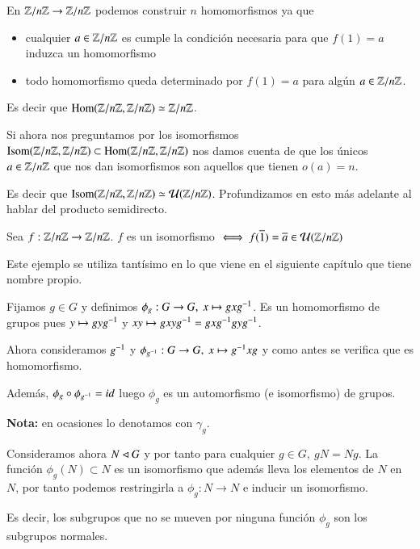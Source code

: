 \begin{ej}
	En $\mathbb{Z}/n\mathbb{Z} \to \mathbb{Z}/n\mathbb{Z}$ podemos construir $n$ homomorfismos ya que
	\begin{itemize}
		\item cualquier $a \in \mathbb{Z}/n\mathbb{Z}$ es cumple la condición necesaria para que $f(1) = a$ induzca un homomorfismo
		\item todo homomorfismo queda determinado por $f(1) = a$ para algún $a \in \mathbb{Z}/n\mathbb{Z}$.
	\end{itemize}
	
	Es decir que $\text{Hom}(\mathbb{Z}/n\mathbb{Z}, \mathbb{Z}/n\mathbb{Z}) \simeq \mathbb{Z}/n\mathbb{Z}$.
\end{ej}

\begin{ej}
	Si ahora nos preguntamos por los isomorfismos $\text{Isom}(\mathbb{Z}/n\mathbb{Z}, \mathbb{Z}/n\mathbb{Z}) \subset \text{Hom}(\mathbb{Z}/n\mathbb{Z}, \mathbb{Z}/n\mathbb{Z})$ nos damos cuenta de que los únicos $a \in \mathbb{Z}/n\mathbb{Z}$ que nos dan isomorfismos son aquellos que tienen $o(a) = n$.
	
	Es decir que $\text{Isom}(\mathbb{Z}/n\mathbb{Z}, \mathbb{Z}/n\mathbb{Z}) \simeq \mathcal{U}(\mathbb{Z}/n\mathbb{Z})$. Profundizamos en esto más adelante al hablar del producto semidirecto.
\end{ej}


\begin{pro}[O ejemplo]
	Sea $f: \mathbb{Z}/n\mathbb{Z} \to \mathbb{Z}/n\mathbb{Z}$. $f$ es un isomorfismo $\iff f(\overline{1}) = \overline{a} \in \mathcal{U}(\mathbb{Z}/n\mathbb{Z})$
\end{pro}

\begin{ej}
	Este ejemplo se utiliza tantísimo en lo que viene en el siguiente capítulo que tiene nombre propio.
	
	Fijamos $g \in G$ y definimos $\phi_g:G \to G,\ x \mapsto gxg^{-1}$. Es un homomorfismo de grupos pues $y\mapsto gyg^{-1}$ y $xy \mapsto gxyg^{-1} = gxg^{-1}gyg^{-1}$.
	
	Ahora consideramos $g^{-1}$ y $\phi_{g^{-1}}: G \to G,\ x \mapsto g^{-1}xg$ y como antes se verifica que es homomorfismo.
	
	Además, $\phi_g \circ \phi_{g^{-1}} = id$ luego $\phi_g$ es un automorfismo (e isomorfismo) de grupos.
	
	\textbf{Nota:} en ocasiones lo denotamos con $\gamma_g$.
\end{ej}


\begin{ej}
	Consideramos ahora $N \lhd G$ y por tanto para cualquier $g \in G,\ gN = Ng$. La función $\phi_g(N) \subset N$ es un isomorfismo que además lleva los elementos de $N$ en $N$, por tanto podemos restringirla a $\phi_g:N \to N$ e inducir un isomorfismo.
	
	Es decir, los subgrupos que no se mueven por ninguna función $\phi_g$ son los subgrupos normales.
\end{ej}

